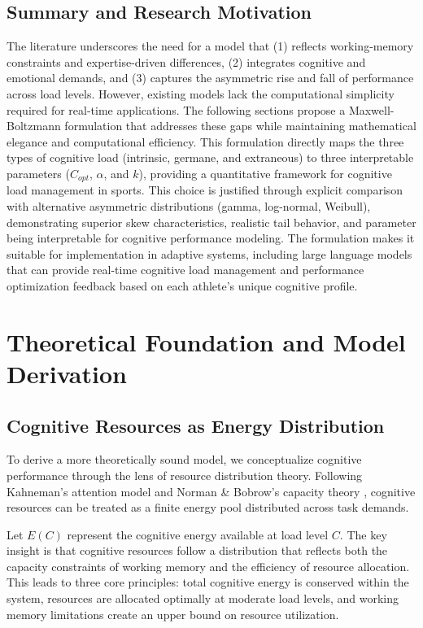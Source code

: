 \documentclass{article}
\begin{document}
\subsection*{Summary and Research Motivation}

The literature underscores the need for a model that (1) reflects working-memory constraints and expertise-driven
differences, (2) integrates cognitive and emotional demands, and (3) captures the asymmetric rise and fall of
performance across load levels. However, existing models lack the computational simplicity required for real-time
applications. The following sections propose a Maxwell-Boltzmann formulation that addresses these gaps while maintaining
mathematical elegance and computational efficiency. This formulation directly maps the three types of cognitive load
(intrinsic, germane, and extraneous) to three interpretable parameters ($C_{opt}$, $\alpha$, and $k$), providing a
quantitative framework for cognitive load management in sports. This choice is justified through explicit comparison
with alternative asymmetric distributions (gamma, log-normal, Weibull), demonstrating superior skew characteristics,
realistic tail behavior, and parameter being interpretable for cognitive performance modeling. The formulation makes it
suitable for implementation in adaptive systems, including large language models that can provide real-time cognitive
load management and performance optimization feedback based on each athlete's unique cognitive profile.

\section*{Theoretical Foundation and Model Derivation}

\subsection*{Cognitive Resources as Energy Distribution}

To derive a more theoretically sound model, we conceptualize cognitive performance through the lens of resource 
distribution theory. Following Kahneman's attention model \citep{kahneman1973} and Norman \& Bobrow's capacity 
theory \citep{norman1975}, cognitive resources can be treated as a finite energy pool distributed across task demands.

Let $E(C)$ represent the cognitive energy available at load level $C$. The key insight is that cognitive resources 
follow a distribution that reflects both the capacity constraints of working memory and the efficiency of resource 
allocation. This leads to three core principles: total cognitive energy is conserved within the system, resources are 
allocated optimally at moderate load levels, and working memory limitations create an upper bound on resource utilization.
\end{document}
